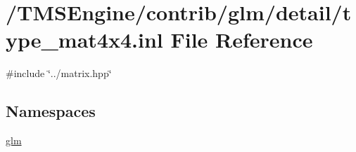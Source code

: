 \hypertarget{type__mat4x4_8inl}{}\section{/\+T\+M\+S\+Engine/contrib/glm/detail/type\+\_\+mat4x4.inl File Reference}
\label{type__mat4x4_8inl}
{\ttfamily \#include \char`\"{}../matrix.\+hpp\char`\"{}}\newline
\subsection*{Namespaces}
\begin{DoxyCompactItemize}
\item 
 \hyperlink{namespaceglm}{glm}
\end{DoxyCompactItemize}
